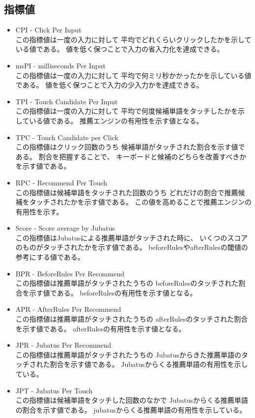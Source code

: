\subsection{指標値}
\begin{itemize}
  \item CPI - Click Per Input\mbox{}\\
    この指標値は一度の入力に対して
    平均でどれくらいクリックしたかを示している値である。
    値を低く保つことで入力の省入力化を達成できる。
  \item msPI - milliseconds Per Input\mbox{}\\
    この指標値は一度の入力に対して
    平均で何ミリ秒かかったかを示している値である。
    値を低く保つことで入力の少入力かを達成できる。
  \item TPI - Touch Candidate Per Input\mbox{}\\
    この指標値は一度の入力に対して
    平均で何度候補単語をタッチしたかを示している値である。
    推薦エンジンの有用性を示す値となる。
  \item TPC - Touch Candidate per Click\mbox{}\\
    この指標値はクリック回数のうち
    候補単語がタッチされた割合を示す値である。
    割合を把握することで、
    キーボードと候補のどちらを改善すべきかを示す値である。
  \item RPC - Recommend Per Touch\mbox{}\\
    この指標値は候補単語をタッチされた回数のうち
    どれだけの割合で推薦候補をタッチされたかを示す値である。
    この値を高めることで推薦エンジンの有用性を示す。
  \item Score - Score average by Jubatus\mbox{}\\
    この指標値はJubatusによる推薦単語がタッチされた時に、
    いくつのスコアのものがタッチされたかを示す値である。
    beforeRulesやafterRulesの閾値の参考にする値である。
  \item BPR - BeforeRules Per Recommend\mbox{}\\
    この指標値は推薦単語がタッチされたうちの
    beforeRulesのタッチされた割合を示す値である。
    beforeRulesの有用性を示す値となる。
  \item APR - AfterRules Per Recommend\mbox{}\\
    この指標値は推薦単語がタッチされたうちの
    afterRulesのタッチされた割合を示す値である。
    afterRulesの有用性を示す値となる。
  \item JPR - Jubatus Per Recommend\mbox{}\\
    この指標値は推薦単語がタッチされたうちの
    Jubatusからきた推薦単語のタッチされた割合を示す値である。
    Jubatusからくる推薦単語の有用性を示している。
  \item JPT - Jubatus Per Touch\mbox{}\\
    この指標値は候補単語をタッチした回数のなかで
    Jubatusからくる推薦単語の割合を示す値である。
    jubatusからくる推薦単語の有用性を示している。
\end{itemize}
